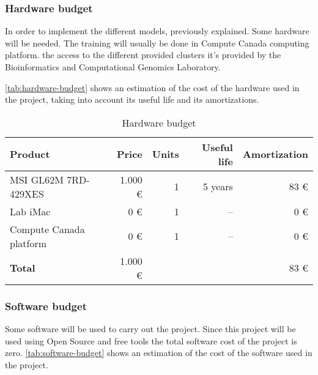 \subsubsection{Hardware budget}

In order to implement the different models, previously explained. Some hardware will be
needed. The training will usually be done in Compute Canada computing platform. the
access to the different provided clusters it's provided by the Bioinformatics and 
Computational Genomics Laboratory.

\autoref{tab:hardware-budget} shows an estimation of the cost of the hardware used in the
project, taking into account its useful life and its amortizations.

\begin{table}[H]
  \centering
  \begin{tabular}{|l|r|r|r|r|}
    \hline
    \textbf{Product} & \textbf{Price} & \textbf{Units} & \textbf{Useful life} 
    & \textbf{Amortization} \\ \hline\hline

    MSI GL62M 7RD-429XES & 1.000 € & 1 & 5 years & 83 € \\ \hline
    Lab iMac & 0 € & 1 & -- & 0 € \\ \hline
    Compute Canada platform & 0 € & 1 & -- & 0 € \\ \hline

    \hline\hline
    \textbf{Total} & 1.000 € & \multicolumn{2}{|c|}{} & 83 € \\ \hline
  \end{tabular}
  \caption{Hardware budget \label{tab:hardware-budget}}
\end{table}

\subsubsection{Software budget}

Some software will be used to carry out the project. Since this project will be used using
Open Source and free tools the total software cost of the project is zero. 
\autoref{tab:software-budget} shows an estimation of the cost of the software used in the 
project.

